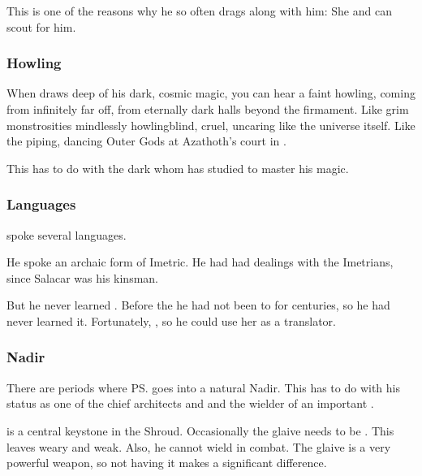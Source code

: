 This is one of the reasons why he so often drags \Criseis{} along with him: 
She  and can scout for him. 





\subsubsection{Howling}
When \Ishnaruchaefir{} draws deep of his dark, cosmic magic, you can hear a faint howling, coming from infinitely far off, from eternally dark halls beyond the firmament. Like grim monstrosities mindlessly howling\dash blind, cruel, uncaring like the universe itself. Like the piping, dancing Outer Gods at Azathoth's court in . 

This has to do with the dark  whom \Ishnaruchaefir{} has studied to master his magic. 





\subsubsection{Languages}
\Ishnaruchaefir{} spoke several languages. 

He spoke an archaic form of Imetric. 
He had had dealings with the Imetrians, since Salacar was his kinsman. 

But he never learned \Velcadian. 
Before the \thirdbanewar{} he had not been to \Azmith{} for centuries, so he had never learned it. 
Fortunately, , so he could use her as a translator. 





\subsubsection{Nadir}
There are periods where \ps{\Ishnaruchaefir} \vertex{} goes into a natural Nadir. 
This has to do with his status as one of the chief architects and  and the wielder of an important . 

\Rystessakhin{} is a central keystone in the Shroud. 
Occasionally the glaive needs to be . 
This leaves \Ishnaruchaefir{} weary and weak. 
Also, he cannot wield \Rystessakhin{} in combat.
The glaive is a very powerful weapon, so not having it makes a significant difference. 

